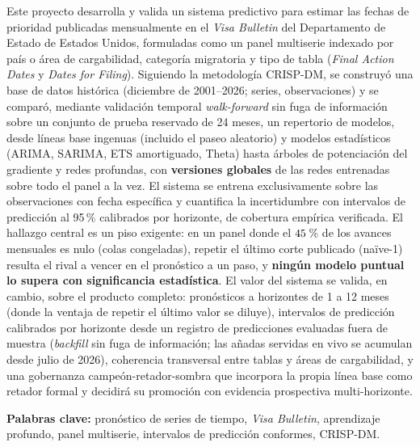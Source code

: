 \documentclass[12pt,letterpaper]{report}
\begin{document}
Este proyecto desarrolla y valida un sistema predictivo para estimar las fechas de
prioridad publicadas mensualmente en el \textit{Visa Bulletin} del Departamento de Estado
de Estados Unidos, formuladas como un panel multiserie indexado por país o área de
cargabilidad, categoría migratoria y tipo de tabla (\textit{Final Action Dates} y
\textit{Dates for Filing}). Siguiendo la metodología CRISP-DM, se construyó una base de
datos histórica (diciembre de 2001--2026; \factNSeriesStructural{} series, \factNObsFmt{} observaciones) y se comparó,
mediante validación temporal \textit{walk-forward} sin fuga de información sobre un conjunto
de prueba reservado de 24 meses, un repertorio de \factNModels{} modelos, desde líneas base ingenuas
(incluido el paseo aleatorio) y modelos estadísticos (ARIMA, SARIMA, ETS amortiguado, Theta)
hasta árboles de potenciación del gradiente y redes profundas, con \textbf{versiones
globales} de las redes entrenadas sobre todo el panel a la vez. El sistema se entrena
exclusivamente sobre las observaciones con fecha específica y cuantifica la incertidumbre con
intervalos de predicción al 95\,\% calibrados por horizonte, de cobertura empírica
verificada. El hallazgo central es un piso exigente: en un panel donde el
$45$\,\% de los avances mensuales es nulo (colas congeladas), repetir el último
corte publicado (naïve-1) resulta el rival a vencer en el pronóstico a un paso, y
\textbf{ningún modelo puntual lo supera con significancia estadística}. El valor del sistema
se valida, en cambio, sobre el producto completo: pronósticos a horizontes de 1 a 12 meses
(donde la ventaja de repetir el último valor se diluye), intervalos de predicción calibrados
por horizonte desde un registro de \factProspNScoredFmt{} predicciones evaluadas fuera de
muestra (\textit{backfill} sin fuga de información; las añadas servidas en vivo se acumulan
desde julio de 2026), coherencia transversal entre tablas y áreas de cargabilidad, y una gobernanza
campeón-retador-sombra que incorpora la propia línea base como retador formal y decidirá su
promoción con evidencia prospectiva multi-horizonte.

\vspace{0.6em}
\noindent\textbf{Palabras clave:} pronóstico de series de tiempo, \textit{Visa Bulletin},
aprendizaje profundo, panel multiserie, intervalos de predicción conformes, CRISP-DM.

\clearpage

\setlength{\parskip}{0pt}
\tableofcontents
\listoffigures
\listoftables
\setlength{\parskip}{0.4em}
\clearpage
\end{document}
